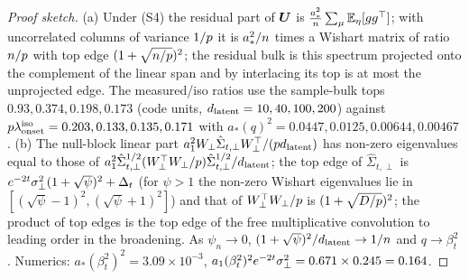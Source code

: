 \begin{proof}[Proof sketch]
(a) Under (S4) the residual part of $\bm{U}$ is $\frac{a_*^2}{n}\sum_\mu\mathbb{E}_\eta[gg^\top]$; with uncorrelated columns of variance $1/p$ it is $a_*^2/n$ times a Wishart matrix of ratio $n/p$ with top edge $(1+\sqrt{n/p})^2$; the residual bulk is this spectrum projected onto the complement of the linear span and by interlacing its top is at most the unprojected edge. The measured/iso ratios use the sample-bulk tops $0.93,0.374,0.198,0.173$ (code units, $d_{\mathrm{latent}}=10,40,100,200$) against $p\lambda^{\rm iso}_{\rm onset}=0.203,0.133,0.135,0.171$ with $a_*(q)^2=0.0447,0.0125,0.00644,0.00467$. (b) The null-block linear part $a_1^2W_\perp\hat\Sigma_{t,\perp}W_\perp^\top/(pd_{\mathrm{latent}})$ has non-zero eigenvalues equal to those of $a_1^2\hat\Sigma_{t,\perp}^{1/2}(W_\perp^\top W_\perp/p)\hat\Sigma_{t,\perp}^{1/2}/d_{\mathrm{latent}}$; the top edge of $\hat\Sigma_{t,\perp}$ is $e^{-2t}\sigma_{\perp}^2(1+\sqrt\psi)^2+\Delta_t$ (for $\psi>1$ the non-zero Wishart eigenvalues lie in $[(\sqrt\psi-1)^2,(\sqrt\psi+1)^2]$) and that of $W_\perp^\top W_\perp/p$ is $(1+\sqrt{D/p})^2$; the product of top edges is the top edge of the free multiplicative convolution to leading order in the broadening. As $\psi_n\to0$, $(1+\sqrt\psi)^2/d_{\mathrm{latent}}\to1/n$ and $q\to\beta_t^2$. Numerics: $a_*(\beta_t^2)^2=3.09\times10^{-3}$, $a_1(\beta_t^2)^2e^{-2t}\sigma_{\perp}^2=0.671\times0.245=0.164$.
\end{proof}

